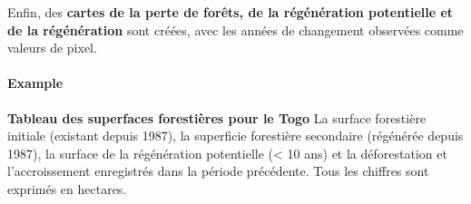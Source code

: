 \documentclass[a4paper, notitlepage, 12pt, krantz2]{krantz}
\let\oldparagraph\paragraph
\renewcommand{\paragraph}[1]{\oldparagraph{#1}\mbox{}}
\begin{document}
Enfin, des \textbf{cartes de la perte de forêts, de la régénération potentielle et de la régénération} sont créées, avec les années de changement observées comme valeurs de pixel.

\hypertarget{example-6}{%
\paragraph{Example}\label{example-6}}

\textbf{Tableau des superfaces forestières pour le Togo } La surface forestière initiale (existant depuis 1987), la superficie forestière secondaire (régénérée depuis 1987), la surface de la régénération potentielle (\textless{} 10 ans) et la déforestation et l'accroissement enregistrés dans la période précédente. Tous les chiffres sont exprimés en hectares.
\end{document}

